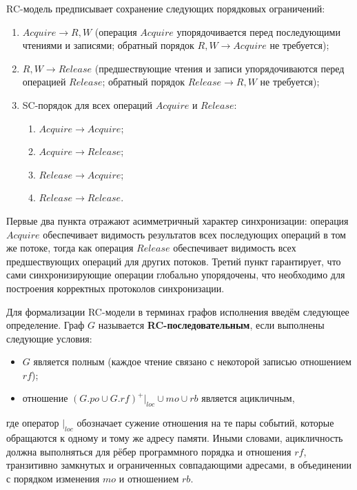 RC-модель предписывает сохранение следующих порядковых ограничений:

\begin{enumerate}
  \item $Acquire \rightarrow R,W$ (операция $Acquire$ упорядочивается
      перед последующими чтениями и записями; обратный порядок $R,W
    \rightarrow Acquire$ не требуется);
  \item $R,W \rightarrow Release$ (предшествующие чтения и записи
      упорядочиваются перед операцией $Release$; обратный порядок
    $Release \rightarrow R,W$ не требуется);
  \item SC-порядок для всех операций $Acquire$ и $Release$:
    \begin{enumerate}
      \item $Acquire \rightarrow Acquire$;
      \item $Acquire \rightarrow Release$;
      \item $Release \rightarrow Acquire$;
      \item $Release \rightarrow Release$.
    \end{enumerate}
\end{enumerate}

Первые два пункта отражают асимметричный характер синхронизации:
операция $Acquire$ обеспечивает видимость результатов всех
последующих операций в том же потоке, тогда как операция $Release$
обеспечивает видимость всех предшествующих операций для других
потоков. Третий пункт гарантирует, что сами синхронизирующие операции
глобально упорядочены, что необходимо для построения корректных
протоколов синхронизации.

Для формализации RC-модели в терминах графов исполнения введём
следующее определение. Граф $G$ называется
\textbf{RC-последовательным}, если выполнены следующие условия:
\begin{itemize}
  \item $G$ является полным (каждое чтение связано с некоторой
    записью отношением $rf$);
  \item отношение $(G.po \cup G.rf)^{+}|_{loc} \cup mo \cup rb$
    является ацикличным,
\end{itemize}
где оператор $|_{loc}$ обозначает сужение отношения на те пары
событий, которые обращаются к одному и тому же адресу памяти. Иными
словами, ацикличность должна выполняться для рёбер программного
порядка и отношения $rf$, транзитивно замкнутых и ограниченных
совпадающими адресами, в объединении с порядком изменения $mo$ и
отношением $rb$.

